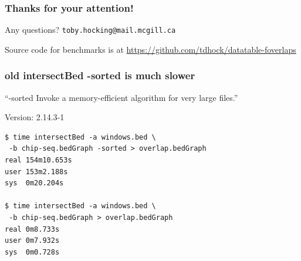 \documentclass{beamer}
\begin{document}
\begin{frame}
  \frametitle{Thanks for your attention!}
  Any questions? \texttt{toby.hocking@mail.mcgill.ca}

  \vskip 1cm

  Source code for benchmarks is at
  \url{https://github.com/tdhock/datatable-foverlaps}
\end{frame}

\begin{frame}[fragile]
  \frametitle{old intersectBed -sorted is much slower}

  ``-sorted Invoke a memory-efficient algorithm for very large files.''

Version: 2.14.3-1


\begin{verbatim}
$ time intersectBed -a windows.bed \
 -b chip-seq.bedGraph -sorted > overlap.bedGraph
real 154m10.653s
user 153m2.188s
sys  0m20.204s

$ time intersectBed -a windows.bed \
 -b chip-seq.bedGraph > overlap.bedGraph
real 0m8.733s
user 0m7.932s
sys  0m0.728s
\end{verbatim}


  
\end{frame}
\end{document}
